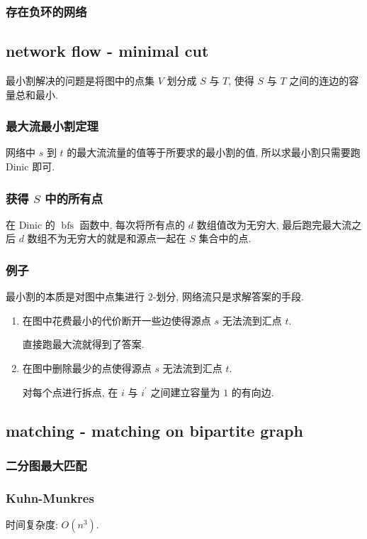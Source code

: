 \documentclass[UTF8, a4paper, titlepage, twoside]{ctexart}
\begin{document}
\subsubsection*{ 存在负环的网络 }

\subsection{ network flow - minimal cut }
最小割解决的问题是将图中的点集 \(V\) 划分成 \(S\) 与 \(T\), 使得 \(S\) 与 \(T\) 之间的连边的容量总和最小.

\subsubsection*{ 最大流最小割定理 }
网络中 \(s\) 到 \(t\) 的最大流流量的值等于所要求的最小割的值, 所以求最小割只需要跑 Dinic 即可.

\subsubsection*{ 获得 \(S\) 中的所有点 }
在 Dinic 的 \(\operatorname{bfs}\) 函数中, 每次将所有点的 \(d\) 数组值改为无穷大, 最后跑完最大流之后 \(d\) 数组不为无穷大的就是和源点一起在 \(S\) 集合中的点.

\subsubsection*{ 例子 }
最小割的本质是对图中点集进行 \(2\)-划分, 网络流只是求解答案的手段.
\begin{enumerate}
	\item 在图中花费最小的代价断开一些边使得源点 \(s\) 无法流到汇点 \(t\).

    直接跑最大流就得到了答案.
    \item 在图中删除最少的点使得源点 \(s\) 无法流到汇点 \(t\).

    对每个点进行拆点, 在 \(i\) 与 \(i^\prime\) 之间建立容量为 \(1\) 的有向边.
\end{enumerate}

\subsection{ matching - matching on bipartite graph }
\subsubsection*{ 二分图最大匹配 }
\subsubsection*{ Kuhn-Munkres }
时间复杂度: \(O(n^3)\).
\end{document}
